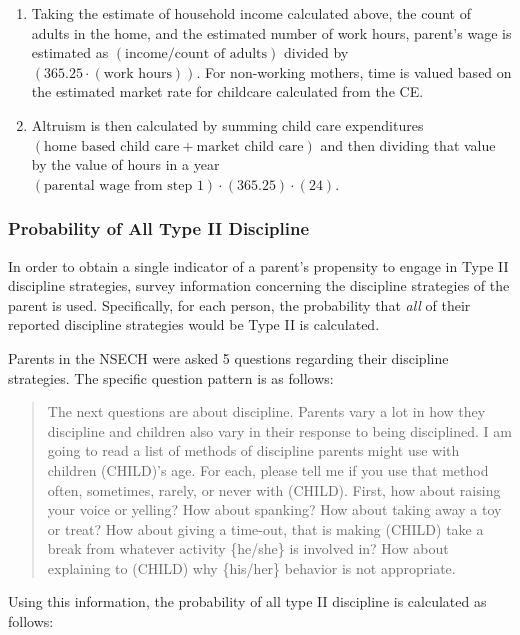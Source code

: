 \documentclass[review]{elsarticle}\usepackage[]{graphicx}\usepackage[]{color}
\begin{document}
\begin{enumerate}
\def\labelenumi{\arabic{enumi}.}
\item
  Taking the estimate of household income calculated above, the count of
  adults in the home, and the estimated number of work hours, parent's
  wage is estimated as $(\text{income}/\text{count of adults})$ divided
  by $(365.25\cdot(\text{work hours}))$. For non-working mothers, time
  is valued based on the estimated market rate for childcare calculated
  from the CE.
\item
  Altruism is then calculated by summing child care expenditures
  $(\text{home based child care} + \text{market child care})$ and then
  dividing that value by the value of hours in a year
  $(\text{parental wage from step 1})\cdot(365.25)\cdot(24)$.
\end{enumerate}

\subsubsection{Probability of All Type II
Discipline}\label{probability-of-all-type-ii-discipline}

In order to obtain a single indicator of a parent's propensity to engage
in Type II discipline strategies, survey information concerning the
discipline strategies of the parent is used. Specifically, for each
person, the probability that \emph{all} of their reported discipline
strategies would be Type II is calculated.

Parents in the NSECH were asked 5 questions regarding their discipline
strategies. The specific question pattern is as follows:

\begin{quote}
The next questions are about discipline. Parents vary a lot in how they
discipline and children also vary in their response to being
disciplined. I am going to read a list of methods of discipline parents
might use with children (CHILD)'s age. For each, please tell me if you
use that method often, sometimes, rarely, or never with (CHILD). First,
how about raising your voice or yelling? How about spanking? How about
taking away a toy or treat? How about giving a time-out, that is making
(CHILD) take a break from whatever activity \{he/she\} is involved in?
How about explaining to (CHILD) why \{his/her\} behavior is not
appropriate.
\end{quote}

Using this information, the probability of all type II discipline is
calculated as follows:
\end{document}
